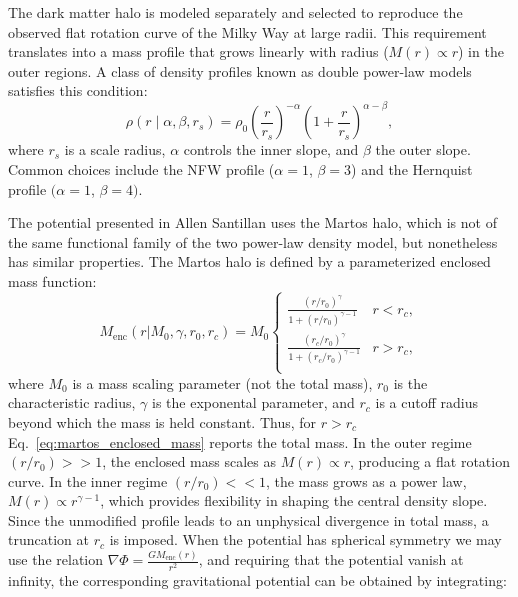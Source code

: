         The dark matter halo is modeled separately and selected to reproduce the observed flat rotation curve of the Milky Way at large radii. This requirement translates into a mass profile that grows linearly with radius ($M(r) \propto r$) in the outer regions. A class of density profiles known as double power-law models satisfies this condition:
        \begin{equation}
            \rho(r \mid \alpha, \beta, r_s) = \rho_0 \left( \frac{r}{r_s} \right)^{-\alpha} \left(1 + \frac{r}{r_s} \right)^{\alpha - \beta},
        \end{equation}
        where $r_s$ is a scale radius, $\alpha$ controls the inner slope, and $\beta$ the outer slope. Common choices include the NFW profile ($\alpha = 1$, $\beta = 3$) and the Hernquist profile $(\alpha = 1$, $\beta = 4)$.

        The potential presented in Allen Santillan uses the Martos halo, which is not of the same functional family of the two power-law density model, but nonetheless has similar properties. The Martos halo is defined by a parameterized enclosed mass function:
        \begin{equation} 
            M_{\mathrm{enc}}(r|M_0,\gamma,r_0,r_c) = M_0
            \begin{cases}
             \frac{\left(r/r_0\right)^\gamma}{1 + \left(r/r_0\right)^{\gamma - 1}} & r<r_c,\\
             \frac{\left(r_c/r_0\right)^\gamma}{1 + \left(r_c/r_0\right)^{\gamma - 1}} & r> r_c,\\
            \end{cases} 
        \end{equation}\label{eq:martos_enclosed_mass}
        where $M_0$ is a mass scaling parameter (not the total mass), $r_0$ is the characteristic radius, $\gamma$ is the exponental parameter, and $r_c$ is a cutoff radius beyond which the mass is held constant. Thus, for $r > r_c$ Eq.~\ref{eq:martos_enclosed_mass} reports the total mass. In the outer regime $(r/r_0) >> 1$, the enclosed mass scales as $M(r) \propto r$, producing a flat rotation curve. In the inner regime $(r/r_0) << 1$, the mass grows as a power law, $M(r) \propto r^{\gamma - 1}$, which provides flexibility in shaping the central density slope. Since the unmodified profile leads to an unphysical divergence in total mass, a truncation at $r_c$ is imposed. When the potential has spherical symmetry we may use the relation $\nabla \Phi = \frac{G M_{\mathrm{enc}}(r)}{r^2}$, and requiring that the potential vanish at infinity, the corresponding gravitational potential can be obtained by integrating:



